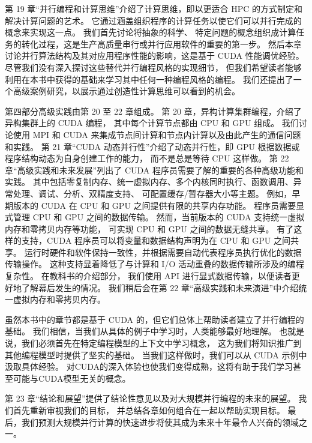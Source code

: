第 19 章“并行编程和计算思维”介绍了计算思维，即以更适合 HPC 的方式制定和解决计算问题的艺术。 
它通过涵盖组织程序的计算任务以使它们可以并行完成的概念来实现这一点。 我们首先讨论将抽象的科学、
特定问题的概念组织成计算任务的转化过程，这是生产高质量串行或并行应用软件的重要的第一步。 
然后本章讨论并行算法结构及其对应用程序性能的影响，这是基于 CUDA 性能调优经验。 
尽管我们没有深入探讨这些替代并行编程风格的实现细节，
但我们希望读者能够利用在本书中获得的基础来学习其中任何一种编程风格的编程。 
我们还提出了一个高级案例研究，以展示通过创造性计算思维可以看到的机会。

第四部分高级实践由第 20 至 22 章组成。 第 20 章，异构计算集群编程，介绍了异构集群上的 CUDA 编程，
其中每个计算节点都由 CPU 和 GPU 组成。 
我们讨论使用 MPI 和 CUDA 来集成节点间计算和节点内计算以及由此产生的通信问题和实践。 
第 21 章“CUDA 动态并行性”介绍了动态并行性，即 GPU 根据数据或程序结构动态为自身创建工作的能力，
而不是总是等待 CPU 这样做。 第 22 章“高级实践和未来发展”列出了 CUDA 程序员需要了解的重要的各种高级功能和实践。 
其中包括零复制内存、统一虚拟内存、多个内核同时执行、函数调用、异常处理、调试、分析、双精度支持、
可配置缓存/暂存器大小等主题。 例如，早期版本的 CUDA 在 CPU 和 GPU 之间提供有限的共享内存功能。 
程序员需要显式管理 CPU 和 GPU 之间的数据传输。 然而，当前版本的 CUDA 支持统一虚拟内存和零拷贝内存等功能，
可实现 CPU 和 GPU 之间的数据无缝共享。 有了这样的支持，CUDA 程序员可以将变量和数据结构声明为在 CPU 和 GPU 之间共享。 
运行时硬件和软件保持一致性，并根据需要自动代表程序员执行优化的数据传输操作。 
这种支持显着降低了与计算和 I/O 活动重叠的数据传输所涉及的编程复杂性。 在教科书的介绍部分，
我们使用 API 进行显式数据传输，以便读者更好地了解幕后发生的情况。 
我们稍后会在第 22 章“高级实践和未来演进”中介绍统一虚拟内存和零拷贝内存。

虽然本书中的章节都是基于 CUDA 的，但它们总体上帮助读者建立了并行编程的基础。 
我们相信，当我们从具体的例子中学习时，人类能够最好地理解。 也就是说，我们必须首先在特定编程模型的上下文中学习概念，
这为我们将知识推广到其他编程模型时提供了坚实的基础。 当我们这样做时，我们可以从 CUDA 示例中汲取具体经验。 
对CUDA的深入体验也使我们变得成熟，这将有助于我们学习甚至可能与CUDA模型无关的概念。

第 23 章“结论和展望”提供了结论性意见以及对大规模并行编程的未来的展望。 我们首先重新审视我们的目标，
并总结各章如何组合在一起以帮助实现目标。 最后，我们预测大规模并行计算的快速进步将使其成为未来十年最令人兴奋的领域之一。
